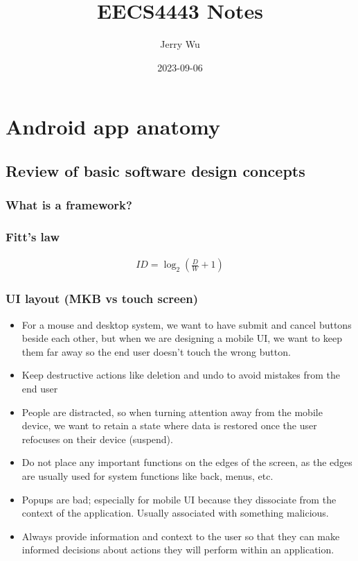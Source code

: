 \documentclass[12pt]{book}
\title{EECS4443 Notes}
\author{Jerry Wu}
\date{2023-09-06}
\begin{document}
\maketitle

\chapter*{Android app anatomy}

\section*{Review of basic software design concepts}

\subsection*{What is a framework?}

\subsection*{Fitt's law}

\begin{align*}
    ID=\log_2\left(\frac{D}{W} + 1\right)
\end{align*}

\subsection*{UI layout (MKB vs touch screen)}

\begin{itemize}
  \item For a mouse and desktop system, we want to have submit and cancel buttons beside each other, but when we are designing a mobile UI, we want to keep them far away so the end user doesn't touch the wrong button.
  \item Keep destructive actions like deletion and undo to avoid mistakes from the end user
  \item People are distracted, so when turning attention away from the mobile device, we want to retain a state where data is restored once the user refocuses on their device (suspend).
  \item Do not place any important functions on the edges of the screen, as the edges are usually used for system functions like back, menus, etc.
  \item Popups are bad; especially for mobile UI because they dissociate from the context of the application. Usually associated with something malicious.
  \item Always provide information and context to the user so that they can make informed decisions about actions they will perform within an application.
\end{itemize}
\end{document}
